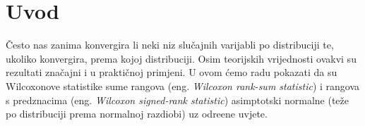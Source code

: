 %
\chapter*{Uvod}
%

\v{C}esto nas zanima konvergira li 
neki niz slu\v{c}ajnih varijabli po distribuciji te,
ukoliko konvergira, prema kojoj distribuciji.
Osim teorijskih vrijednosti ovakvi su rezultati
zna\v{c}ajni i u prakti\v{c}noj primjeni.
U ovom \'{c}emo radu pokazati da su Wilcoxonove
statistike sume rangova (eng. \textit{Wilcoxon rank-sum
statistic}) i rangova s predznacima (eng.
\textit{Wilcoxon signed-rank statistic})
asimptotski normalne (te\v{z}e po distribuciji
prema normalnoj razdiobi) uz odre\dj{}ene uvjete.

